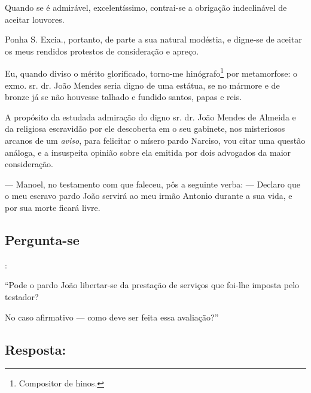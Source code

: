 Quando se é admirável, excelentíssimo, contrai-se a obrigação
indeclinável de aceitar louvores.

Ponha S. Excia., portanto, de parte a sua natural modéstia, e digne-se
de aceitar os meus rendidos protestos de consideração e apreço.

Eu, quando diviso o mérito glorificado, torno-me hinógrafo\footnote{
  Compositor de hinos.} por metamorfose: o exmo. sr. dr. João Mendes
seria digno de uma estátua, se no mármore e de bronze já se não houvesse
talhado e fundido santos, papas e reis.

A propósito da estudada admiração do digno sr. dr. João Mendes de
Almeida e da religiosa escravidão por ele descoberta em o seu gabinete,
nos misteriosos arcanos de um \emph{aviso}, para felicitar o mísero
pardo Narciso, vou citar uma questão análoga, e a insuspeita opinião
sobre ela emitida por dois advogados da maior consideração.

--- Manoel, no testamento com que faleceu, pôs a seguinte verba: ---
Declaro que o meu escravo pardo João servirá ao meu irmão Antonio
durante a sua vida, e por sua morte ficará livre.

\subsection{Pergunta-se}:

``Pode o pardo João libertar-se da prestação de serviços que foi-lhe
imposta pelo testador?

No caso afirmativo --- como deve ser feita essa avaliação?''

\subsection{Resposta:}

